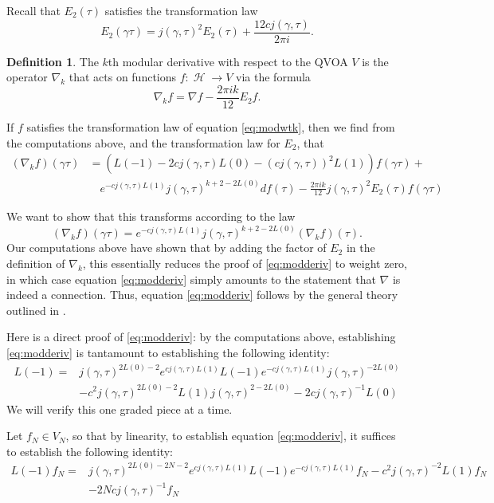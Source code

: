 \documentclass[12pt]{amsart}
\theoremstyle{plain}
\theoremstyle{definition}
\newtheorem{dfn}[thm]{Definition}
\theoremstyle{remark}
\DeclareMathOperator{\uhp}{\mathcal{H}}
\begin{document}
Recall that $E_2(\tau)$ 
satisfies the transformation law
\begin{equation}
\label{eq:E2modulartransformation}
E_2(\gamma\tau) = j(\gamma,\tau)^2E_2(\tau) +\frac{12 cj(\gamma,\tau)}{2\pi i}.    
\end{equation}
\begin{dfn}
    \label{d:moderiv}
    The $k$th modular derivative with respect to the QVOA $V$ is the operator $\nabla_{k}$ that acts on functions $f\colon \uhp \to V$ via the formula
    \[
    \nabla_{k} f = \nabla f -\frac{2\pi i k}{12}E_2f.
    \]
\end{dfn}
If $f$ satisfies the transformation law of equation \eqref{eq:modwtk}, then we find from the computations above, and the transformation law for $E_2$, that
\begin{align*}
    (\nabla_kf)(\gamma\tau) &= \left(L(-1)-2cj(\gamma,\tau)L(0)-(cj(\gamma,\tau))^2L(1)\right)f(\gamma\tau)+\\
    &\quad e^{-cj(\gamma,\tau)L(1)}j(\gamma,\tau)^{k+2-2L(0)}df(\tau)-\frac{2\pi i k}{12}j(\gamma,\tau)^2E_2(\tau)f(\gamma \tau)
\end{align*}

We want to show that this transforms according to the law
\begin{equation}
\label{eq:modderiv}
(\nabla_k f)(\gamma \tau) = e^{-cj(\gamma,\tau)L(1)}j(\gamma,\tau)^{k+2-2L(0)}(\nabla_kf)(\tau).    
\end{equation}
Our computations above have shown that by adding the factor of $E_2$ in the definition of $\nabla_k$, this essentially reduces the proof of \eqref{eq:modderiv} to weight zero, in which case equation \eqref{eq:modderiv} simply amounts to the statement that $\nabla$ is indeed a connection. Thus, equation \eqref{eq:modderiv} follows by the general theory outlined in \cite{FBZ}.

\medskip
Here is a direct proof of \eqref{eq:modderiv}: by the computations above, establishing \eqref{eq:modderiv} is tantamount to establishing the following identity:
\begin{align*}
L(-1)=&j(\gamma,\tau)^{2L(0)-2}e^{cj(\gamma,\tau)L(1)}L(-1)e^{-cj(\gamma,\tau)L(1)}j(\gamma,\tau)^{-2L(0)}\\
 &-c^2j(\gamma,\tau)^{2L(0)-2}L(1)j(\gamma,\tau)^{2-2L(0)}-2cj(\gamma,\tau)^{-1}L(0)
\end{align*}
We will verify this one graded piece at a time. 

\medskip
Let $f_N \in V_N$, so that by linearity, to establish equation \eqref{eq:modderiv}, it suffices to establish the following identity:
\begin{align}
\label{eq:connectionproof}
 L(-1)f_N=&j(\gamma,\tau)^{2L(0)-2N-2}e^{cj(\gamma,\tau)L(1)}L(-1)e^{-cj(\gamma,\tau)L(1)}f_N-c^2j(\gamma,\tau)^{-2}L(1)f_N\\
\nonumber &-2Ncj(\gamma,\tau)^{-1}f_N   
\end{align}
\end{document}
